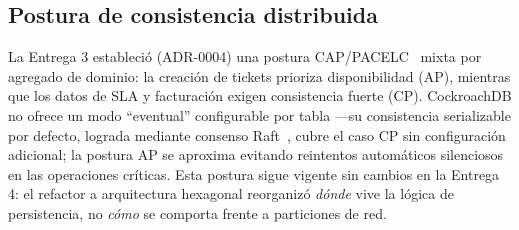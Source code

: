 \subsection{Postura de consistencia distribuida}

La Entrega 3 estableció (ADR-0004) una postura CAP/PACELC~\cite{brewer2012cap,abadi2012consistency}
mixta por agregado de dominio: la creación de tickets prioriza disponibilidad (AP), mientras que
los datos de SLA y facturación exigen consistencia fuerte (CP). CockroachDB no ofrece un modo
``eventual'' configurable por tabla —su consistencia serializable por defecto, lograda mediante
consenso Raft~\cite{ongaro2014raft}, cubre el caso CP sin configuración adicional; la postura AP
se aproxima evitando reintentos automáticos silenciosos en las operaciones críticas. Esta postura
sigue vigente sin cambios en la Entrega 4: el refactor a arquitectura hexagonal reorganizó
\emph{dónde} vive la lógica de persistencia, no \emph{cómo} se comporta frente a particiones de
red.
